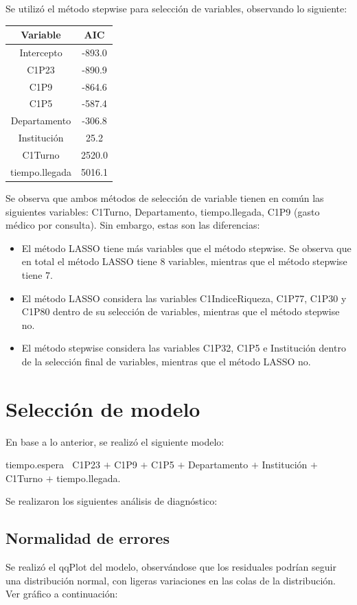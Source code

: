 \documentclass{article}
\begin{document}
Se utilizó el método stepwise para selección de variables, observando lo siguiente:

\begin{center}
\begin{tabular}{cc}
\hline
Variable       & AIC    \\ \hline
Intercepto     & -893.0 \\
C1P23          & -890.9 \\
C1P9           & -864.6 \\
C1P5           & -587.4 \\
Departamento   & -306.8 \\
Institución    & 25.2   \\
C1Turno        & 2520.0 \\
tiempo.llegada & 5016.1 \\ \hline
\end{tabular}
\end{center}

Se observa que ambos métodos de selección de variable tienen en común las siguientes variables: C1Turno, Departamento, tiempo.llegada, C1P9 (gasto médico por consulta). Sin embargo, estas son las diferencias:
\begin{itemize}
	\item El método LASSO tiene más variables que el método stepwise. Se observa que en total el método LASSO tiene 8 variables, mientras que el método stepwise tiene 7.
	\item El método LASSO considera las variables C1IndiceRiqueza, C1P77, C1P30 y C1P80 dentro de su selección de variables, mientras que el método stepwise no.
	\item El método stepwise considera las variables C1P32, C1P5 e Institución dentro de la selección final de variables, mientras que el método LASSO no.
\end{itemize}
\section{Selección de modelo}
En base a lo anterior, se realizó el siguiente modelo:
\begin{center}
tiempo.espera $~$ C1P23 $+$ C1P9 $+$ C1P5 $+$ Departamento $+$ Institución $+$ C1Turno $+$ tiempo.llegada.
\end{center}

Se realizaron los siguientes análisis de diagnóstico:
\subsection{Normalidad de errores}
Se realizó el qqPlot del modelo, observándose que los residuales podrían seguir una distribución normal, con ligeras variaciones en las colas de la distribución. Ver gráfico a continuación:
\end{document}
